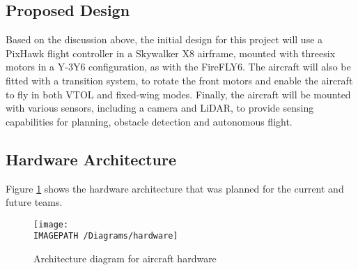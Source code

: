 \subsection{Proposed Design}
Based on the discussion above, the initial design for this project will use a PixHawk flight controller in a Skywalker X8 airframe, mounted with threesix motors in a Y-3Y6 configuration, as with the FireFLY6. The aircraft will also be fitted with a transition system, to rotate the front motors and enable the aircraft to fly in both VTOL and fixed-wing modes. Finally, the aircraft will be mounted with various sensors, including a camera and LiDAR, to provide sensing capabilities for planning, obstacle detection and autonomous flight.

\subsection{Hardware Architecture}

Figure \ref{fig:hardwarearch} shows the hardware architecture that was planned for the current and future teams.

\begin{figure}[!h]
	\centering
	\texttt{[image: \\IMAGEPATH /Diagrams/hardware]}
	\caption{Architecture diagram for aircraft hardware}
	\label{fig:hardwarearch}
\end{figure}


